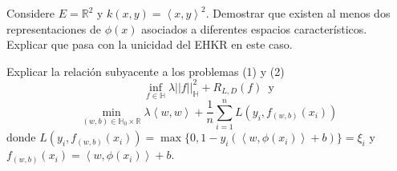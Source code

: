 \documentclass[12pt]{exam}
\begin{document}
\begin{questions}
\question[3] Considere $E=\mathbb{R}^2$ y $k(x,y)=\left<x,y\right>^2$. Demostrar que existen al menos dos representaciones de $\phi(x)$ asociados a diferentes espacios caracter\'isticos. Explicar que pasa con la unicidad del EHKR en este caso.
\addpoints

\question[3] Explicar la relaci\'on subyacente a los problemas (1) y (2)
\begin{equation}
	\inf_{f\in\mathbb{H}}\lambda||f||_{\mathbb{H}}^{2}+R_{L,D}(f)\,\,\,\text{y}
\end{equation}
\begin{equation}
	\min_{(w,b)\in\mathbb{H}_0\times\mathbb{R}}\lambda\left<w,w\right>+\frac{1}{n}\displaystyle\sum_{i=1}^{n}L(y_i,f_{(w,b)}(x_i))
\end{equation}
donde $L(y_i,f_{(w,b)}(x_i))=\max\{0,1-y_i(\left<w,\phi(x_i)\right>+b)\}=\xi_i$ y $f_{(w,b)}(x_i)=\left<w,\phi(x_i)\right>+b$.

\addpoints


\end{questions}
\end{document}
